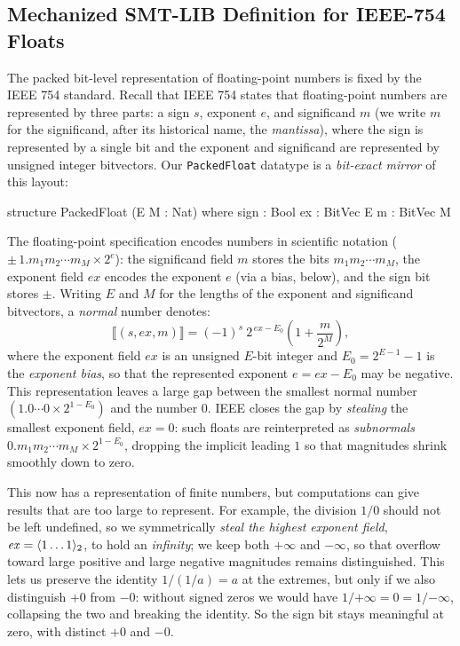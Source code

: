 \subsection{Mechanized SMT-LIB Definition for IEEE-754 Floats}\label{sec:fp:ieee754}

The packed bit-level representation of floating-point numbers is fixed by the IEEE 754 standard.
Recall that IEEE 754 states that floating-point numbers are represented by three parts:
a sign $s$, exponent $e$, and significand $m$ (we write $m$ for the significand, after its historical name, the \textit{mantissa}),
where the sign is represented by a single bit and the exponent and significand are represented by unsigned integer bitvectors.
Our \texttt{PackedFloat} datatype
is a \emph{bit-exact mirror} of this layout:
\begin{lean4}
structure PackedFloat (E M : Nat) where
  sign : Bool     ex : BitVec E     m  : BitVec M
\end{lean4}
\noindent The floating-point specification encodes numbers in scientific notation ($\pm\, 1.m_1 m_2 \cdots m_M \times 2^{e}$):
the significand field $m$ stores the bits $m_1 m_2 \cdots m_M$, the exponent field $\mathit{ex}$ encodes the exponent $e$ (via a bias, below), and the sign bit stores $\pm$.
Writing $E$ and $M$ for the lengths of the exponent and significand bitvectors, a \emph{normal} number denotes:
\begin{equation}
\llbracket (s, \mathit{ex}, m) \rrbracket = (-1)^s\ 2^{\,\mathit{ex} - E_0} \left(1 + \frac{m}{2^M}\right),
\end{equation}
where the exponent field $\mathit{ex}$ is an unsigned $E$-bit integer and $E_0 = 2^{E-1} - 1$ is the \textit{exponent bias}, so that the represented exponent $e = \mathit{ex} - E_0$ may be negative.
This representation leaves a large gap between the smallest normal number $(1.0\cdots0 \times 2^{1 - E_0})$ and the number $0$.
IEEE closes the gap by \emph{stealing} the smallest exponent field, $\mathit{ex} = 0$: such floats are reinterpreted as \emph{subnormals} $0.m_1 m_2 \cdots m_M \times 2^{1 - E_0}$, dropping the implicit leading $1$ so that magnitudes shrink smoothly down to zero.

This now has a representation of finite numbers, but computations can give results that are too large to represent.
For example, the division $1/0$ should not be left undefined, so we symmetrically \emph{steal the highest exponent field}, $\mathit{ex} = \langle 1\dots1 \rangle_{2}$, to hold an \emph{infinity}; we keep both $+\infty$ and $-\infty$, so that overflow toward large positive and large negative magnitudes remains distinguished. This lets us preserve the identity $1/(1/a) = a$ at the extremes, but only if we also distinguish $+0$ from $-0$: without signed zeros we would have $1/{+\infty} = 0 = 1/{-\infty}$, collapsing the two and breaking the identity.
So the sign bit stays meaningful at zero, with distinct $+0$ and $-0$.

